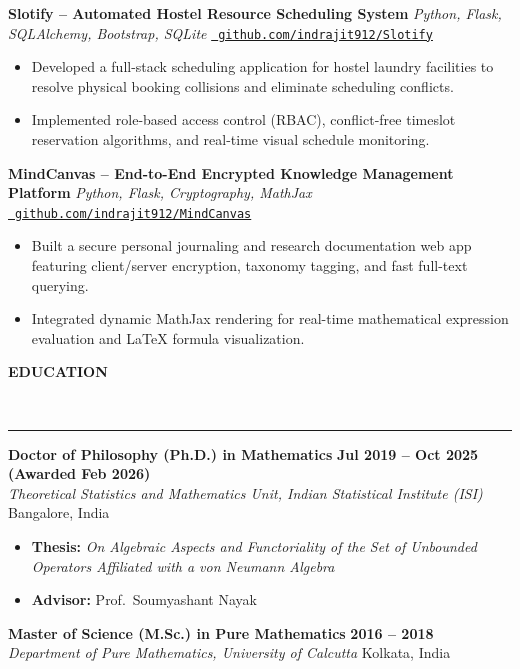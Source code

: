 \documentclass[10pt,a4paper]{article}
\newcommand{\cvsection}[1]{%
  \vspace{0.35em}%
  \phantomsection%
  \addcontentsline{toc}{section}{#1}%
  {\noindent\raggedright\color{primary}\fontsize{9.6pt}{11pt}\bfseries\MakeUppercase{#1}}\\[-0.74em]%
  {\noindent\color{accentblue}\rule{\linewidth}{0.80pt}}\par%
  \vspace{0.18em}%
}
\newcommand{\cvexperience}[4]{%
  \noindent\textbf{\color{primary}#1} \hfill {\small\color{textsecondary}\textbf{#2}}\\[0.05em]%
  \noindent\textit{\small\color{textdark}#3} \hfill {\small\color{textsecondary}#4}\par%
  \vspace{0.06em}%
}
\newcommand{\cvproject}[4]{%
  \noindent\textbf{\color{primary}#1} \enskip{\color{rulecolor}\textbar}\enskip \textit{\small\color{textdark}#2} \hfill {\small\color{accentblue}\href{#3}{\faGithub\ \texttt{#4}}}\par%
  \vspace{0.06em}%
}
\begin{document}
\vspace{0.08em}
\cvproject{Slotify -- Automated Hostel Resource Scheduling System}{Python, Flask, SQLAlchemy, Bootstrap, SQLite}{https://github.com/indrajit912/Slotify}{github.com/indrajit912/Slotify}
\begin{itemize}
  \item Developed a full-stack scheduling application for hostel laundry facilities to resolve physical booking collisions and eliminate scheduling conflicts.
  \item Implemented role-based access control (RBAC), conflict-free timeslot reservation algorithms, and real-time visual schedule monitoring.
\end{itemize}

\vspace{0.08em}
\cvproject{MindCanvas -- End-to-End Encrypted Knowledge Management Platform}{Python, Flask, Cryptography, MathJax}{https://github.com/indrajit912/MindCanvas}{github.com/indrajit912/MindCanvas}
\begin{itemize}
  \item Built a secure personal journaling and research documentation web app featuring client/server encryption, taxonomy tagging, and fast full-text querying.
  \item Integrated dynamic MathJax rendering for real-time mathematical expression evaluation and LaTeX formula visualization.
\end{itemize}

\cvsection{Education}

\cvexperience{Doctor of Philosophy (Ph.D.) in Mathematics}{Jul 2019 -- Oct 2025 (Awarded Feb 2026)}{Theoretical Statistics and Mathematics Unit, Indian Statistical Institute (ISI)}{Bangalore, India}
\begin{itemize}
  \item \textbf{Thesis:} \textit{On Algebraic Aspects and Functoriality of the Set of Unbounded Operators Affiliated with a von Neumann Algebra}
  \item \textbf{Advisor:} Prof.~Soumyashant Nayak
\end{itemize}

\vspace{0.06em}
\cvexperience{Master of Science (M.Sc.) in Pure Mathematics}{2016 -- 2018}{Department of Pure Mathematics, University of Calcutta}{Kolkata, India}
\end{document}
